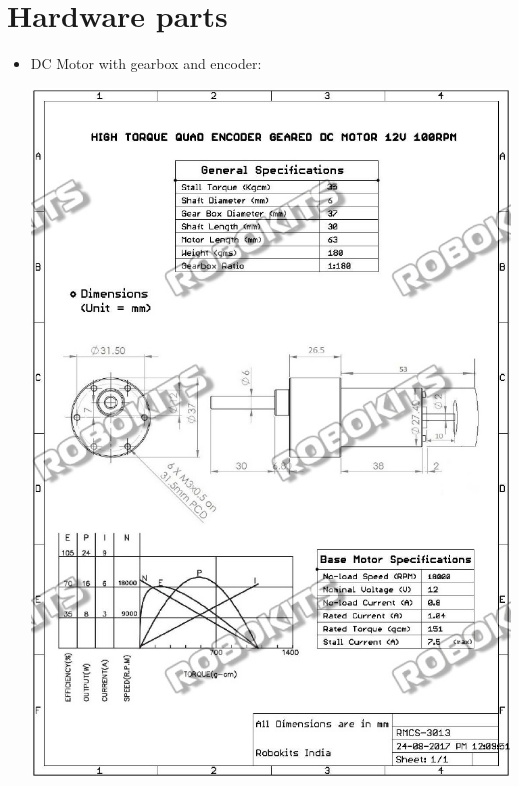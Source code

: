 \documentclass[a4paper,12pt,oneside]{book}
\begin{document}
\section{Hardware parts}
\begin{itemize}
  \item DC Motor with gearbox and encoder:
	\begin{center}
		\includegraphics[scale=.35]{Motor_Datasheet.jpg}
	\end{center}
	\begin{center}

\end{center}
\end{itemize}
\end{document}
